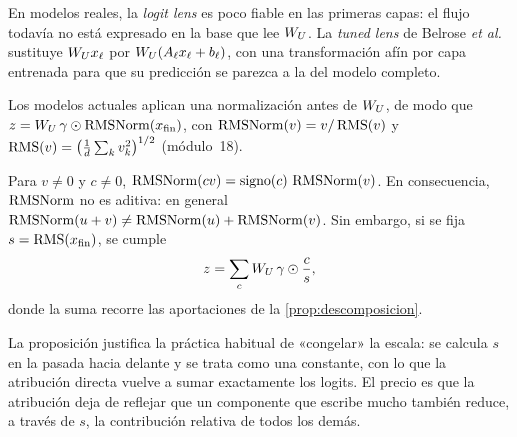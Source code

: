 \addtocounter{definicion}{1}%

En modelos reales, la \emph{logit lens} es poco fiable en las primeras capas: el flujo todavía no está expresado en la base que lee $W_{U}$. La \emph{tuned lens} de Belrose \emph{et al.}~\cite{belrose} sustituye $W_{U} x_\ell$ por $W_{U}(A_\ell x_\ell+b_\ell)$, con una transformación afín por capa entrenada para que su predicción se parezca a la del modelo completo.

Los modelos actuales aplican una normalización antes de $W_{U}$, de modo que $z=W_{U}\,\gamma\odot\operatorname{RMSNorm}(x_{\mathrm{fin}})$, con $\operatorname{RMSNorm}(v)=v/\operatorname{RMS}(v)$ y $\operatorname{RMS}(v)=\bigl(\tfrac1d\sum_kv_k^{2}\bigr)^{1/2}$ (módulo~18).

\begin{proposicion}\label{prop:rmsnorm}
Para $v\neq 0$ y $c\neq 0$, $\operatorname{RMSNorm}(cv)=\operatorname{signo}(c)\,\operatorname{RMSNorm}(v)$. En consecuencia, $\operatorname{RMSNorm}$ no es aditiva: en general $\operatorname{RMSNorm}(u+v)\neq\operatorname{RMSNorm}(u)+\operatorname{RMSNorm}(v)$. Sin embargo, si se fija $s=\operatorname{RMS}(x_{\mathrm{fin}})$, se cumple
\[
z=\sum_{c}W_{U}\,\gamma\odot\frac{c}{s},
\]
donde la suma recorre las aportaciones de la \cref{prop:descomposicion}.
\end{proposicion}

La proposición justifica la práctica habitual de «congelar» la escala: se calcula $s$ en la pasada hacia delante y se trata como una constante, con lo que la atribución directa vuelve a sumar exactamente los logits. El precio es que la atribución deja de reflejar que un componente que escribe mucho también reduce, a través de $s$, la contribución relativa de todos los demás.

